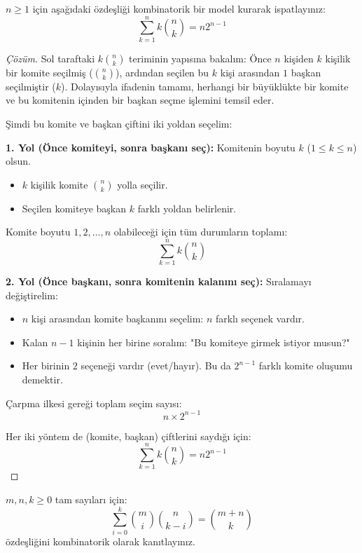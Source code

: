 \begin{example}
$n \ge 1$ için aşağıdaki özdeşliği kombinatorik bir model kurarak ispatlayınız:
\[ \sum_{k=1}^{n} k \binom{n}{k} = n 2^{n-1} \]
\end{example}

\begin{proof}[Çözüm]
Sol taraftaki $k \binom{n}{k}$ teriminin yapısına bakalım: Önce $n$ kişiden $k$ kişilik bir komite seçilmiş ($\binom{n}{k}$), ardından seçilen bu $k$ kişi arasından $1$ başkan seçilmiştir ($k$). Dolayısıyla ifadenin tamamı, herhangi bir büyüklükte bir komite ve bu komitenin içinden bir başkan seçme işlemini temsil eder.

Şimdi bu komite ve başkan çiftini iki yoldan seçelim:

\textbf{1. Yol (Önce komiteyi, sonra başkanı seç):}
Komitenin boyutu $k$ ($1 \le k \le n$) olsun.
\begin{itemize}
    \item $k$ kişilik komite $\binom{n}{k}$ yolla seçilir.
    \item Seçilen komiteye başkan $k$ farklı yoldan belirlenir.
\end{itemize}
Komite boyutu $1, 2, \dots, n$ olabileceği için tüm durumların toplamı:
\[ \sum_{k=1}^{n} k \binom{n}{k} \]

\textbf{2. Yol (Önce başkanı, sonra komitenin kalanını seç):}
Sıralamayı değiştirelim:
\begin{itemize}
    \item $n$ kişi arasından komite başkanını seçelim: $n$ farklı seçenek vardır.
    \item Kalan $n-1$ kişinin her birine soralım: "Bu komiteye girmek istiyor musun?"
    \item Her birinin $2$ seçeneği vardır (evet/hayır). Bu da $2^{n-1}$ farklı komite oluşumu demektir.
\end{itemize}
Çarpma ilkesi gereği toplam seçim sayısı:
\[ n \times 2^{n-1} \]

Her iki yöntem de (komite, başkan) çiftlerini saydığı için:
\[ \sum_{k=1}^{n} k \binom{n}{k} = n 2^{n-1} \]
\end{proof}

\begin{example}
$m, n, k \ge 0$ tam sayıları için:
\[ \sum_{i=0}^{k} \binom{m}{i} \binom{n}{k-i} = \binom{m+n}{k} \]
özdeşliğini kombinatorik olarak kanıtlayınız.
\end{example}

